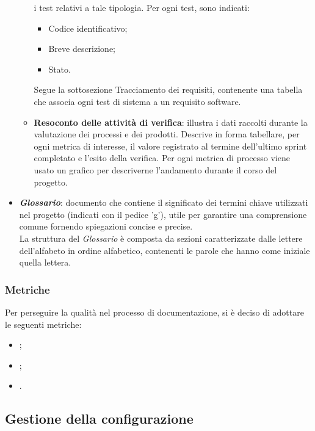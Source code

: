 \begin{itemize}
\begin{itemize}
                        i test relativi a tale tipologia. Per ogni test, sono indicati:
                        \begin{itemize}
                              \item Codice identificativo;
                              \item Breve descrizione;
                              \item Stato.
                        \end{itemize}
                        Segue la sottosezione Tracciamento dei requisiti, contenente una tabella che associa
                        ogni test di sistema a un requisito software.
                  \item \textbf{Resoconto delle attività di verifica}: illustra i dati raccolti durante la valutazione dei processi e dei prodotti.
                        Descrive in forma tabellare, per ogni metrica di interesse, il valore registrato al termine dell'ultimo sprint
                        completato e l'esito della verifica. Per ogni metrica di processo viene usato un grafico per descriverne l'andamento
                        durante il corso del progetto.
            \end{itemize}
      \item \textit{\textbf{Glossario}}: documento che contiene il significato dei termini chiave utilizzati nel progetto (indicati con il pedice 'g'), utile per garantire una comprensione comune fornendo spiegazioni concise e precise.
            \\La struttura del \textit{Glossario} è composta da sezioni caratterizzate dalle lettere dell'alfabeto in ordine alfabetico, contenenti le parole che hanno come iniziale quella lettera.
\end{itemize}

\subsubsection{Metriche}
Per perseguire la qualità nel processo di documentazione, si è deciso
di adottare le seguenti metriche:
\begin{itemize}
      \item {};
      \item {};
      \item {}.
\end{itemize}

\subsection{Gestione della configurazione}
